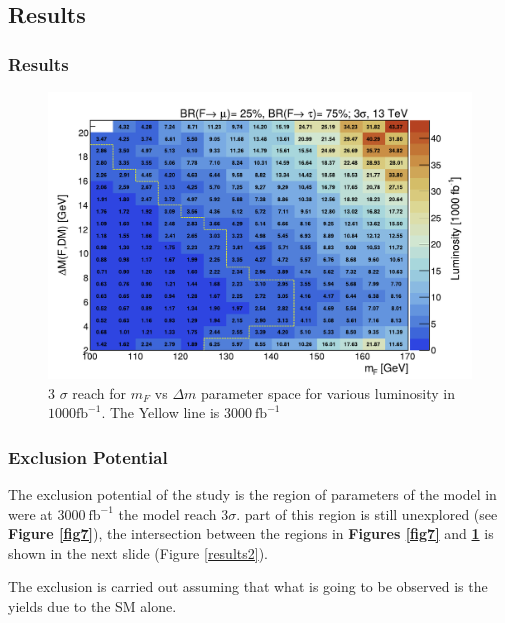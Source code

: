 \documentclass{beamer}
\begin{document}
\begin{frame}
\section{Results}
\frametitle{Results}

\begin{figure}
\centering

\includegraphics[scale=0.45]{pictures/LumiToExclusionSigma3_BRmu25tau75} 
\caption{3 $\sigma$ reach for $m_{F}$ vs  $\Delta m$ parameter space for various luminosity in $1000\text{fb}^{-1}$. The Yellow line is $3000~\text{fb}^{-1}$}
\label{results}
\end{figure}

\end{frame}



\begin{frame}
\frametitle{Exclusion Potential}
\begin{justify}

The exclusion potential of the study is the region of parameters of the model in were at $3000~\text{fb}^{-1}$ the model reach $3\sigma$. part of this region is still unexplored (see \textbf{Figure \ref{fig7}}), the intersection between the regions in \textbf{Figures \ref{fig7}} and \textbf{\ref{results}} is shown in the next slide (Figure \ref{results2}).

The exclusion is carried out assuming that what is going to be observed is the yields due to the SM alone.
\end{justify}
\end{frame}
\end{document}
